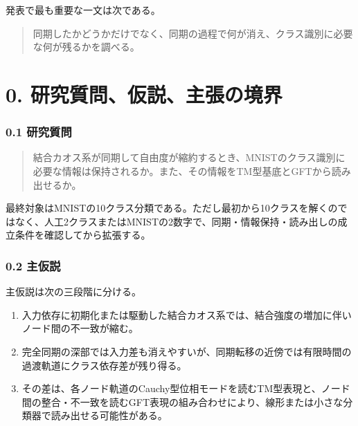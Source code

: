\documentclass[11pt,a4paper]{ltjsarticle}
\newenvironment{keyquote}{%
  \begin{quote}\color{researchteal}\bfseries\large%
}{%
  \end{quote}%
}
\begin{document}
発表で最も重要な一文は次である。\par

\begin{keyquote}

同期したかどうかだけでなく、同期の過程で何が消え、クラス識別に必要な何が残るかを調べる。

\end{keyquote}

\par\medskip{\color{researchline}\hrule}\medskip

\section*{\textcolor{researchink}{0. 研究質問、仮説、主張の境界}}


\subsubsection*{\textcolor{researchteal}{0.1 研究質問}}

\begin{keyquote}

結合カオス系が同期して自由度が縮約するとき、MNISTのクラス識別に必要な情報は保持されるか。また、その情報をTM型基底とGFTから読み出せるか。

\end{keyquote}

最終対象はMNISTの10クラス分類である。ただし最初から10クラスを解くのではなく、人工2クラスまたはMNISTの2数字で、同期・情報保持・読み出しの成立条件を確認してから拡張する。\par

\subsubsection*{\textcolor{researchteal}{0.2 主仮説}}

主仮説は次の三段階に分ける。\par

\begin{enumerate}

\item 入力依存に初期化または駆動した結合カオス系では、結合強度の増加に伴いノード間の不一致が縮む。

\item 完全同期の深部では入力差も消えやすいが、同期転移の近傍では有限時間の過渡軌道にクラス依存差が残り得る。

\item その差は、各ノード軌道のCauchy型位相モードを読むTM型表現と、ノード間の整合・不一致を読むGFT表現の組み合わせにより、線形または小さな分類器で読み出せる可能性がある。

\end{enumerate}
\end{document}
